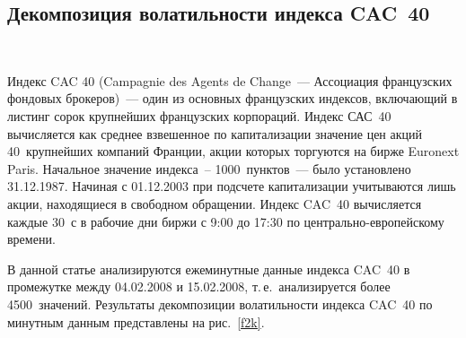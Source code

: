 \begin{multicols}{2}
\subsection{Декомпозиция волатильности индекса CAC~40}
\begin{figure*} %
\vspace*{1pt}
\begin{center}
\mbox{%
\epsfxsize=105.017mm
}
\end{center}
\vspace*{-9pt}
\end{figure*}


Индекс CAC 40 (Campagnie des Agents de Change~--- Ассоциация
французских фондовых брокеров)~--- один из основных французских
индексов, включающий в листинг сорок крупнейших французских
корпораций. Индекс САС~40 вычисляется как среднее взвешенное по
капитализации значение цен акций 40~крупнейших компаний Франции,
акции которых торгуются на бирже Euronext Paris. Начальное
значение индекса~-- 1000~пунктов~--- было установлено 31.12.1987.
Начиная с 01.12.2003 при подсчете
капитализации учитываются лишь акции, находящиеся в свободном
обращении. Индекс CAC~40 вычисляется каждые 30~с в рабочие
дни биржи с 9:00 до 17:30 по центрально-европейскому времени.

В данной статье анализируются ежеминутные данные индекса CAC~40 в
промежутке между 04.02.2008 и 15.02.2008, т.\,е.\ анализируется
более 4500~значений. Результаты декомпозиции волатильности индекса
CAC~40 по минутным данным представлены на рис.~\ref{f2k}.


\end{multicols}
